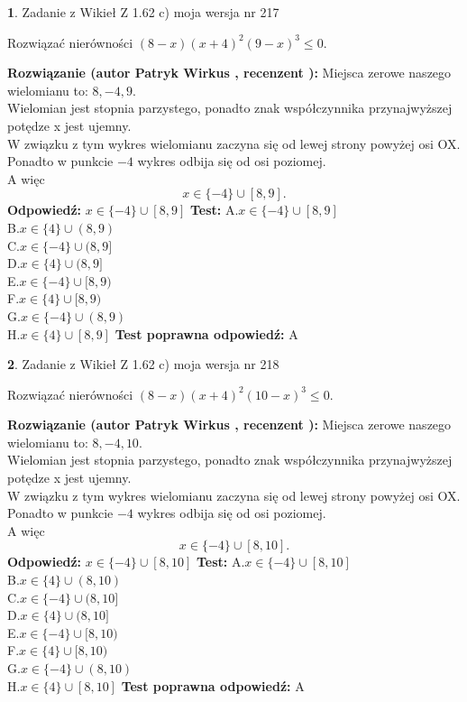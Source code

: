 \documentclass[12pt, a4paper]{article}
\theoremstyle{definition} %
\newtheorem{zad}{}
\newcommand{\zadStart}[1]{\begin{zad}#1\newline}
\newcommand{\zadStop}{\end{zad}}
\newcommand{\rozwStart}[2]{\noindent \textbf{Rozwiązanie (autor #1 , recenzent #2): }\newline}
\newcommand{\rozwStop}{\newline}
\newcommand{\odpStart}{\noindent \textbf{Odpowiedź:}\newline}
\newcommand{\odpStop}{\newline}
\newcommand{\testStart}{\noindent \textbf{Test:}\newline}
\newcommand{\testStop}{\newline}
\newcommand{\kluczStart}{\noindent \textbf{Test poprawna odpowiedź:}\newline}
\newcommand{\kluczStop}{\newline}
\begin{document}
\zadStart{Zadanie z Wikieł Z 1.62 c) moja wersja nr 217}

Rozwiązać nierówności $(8-x)(x+4)^{2}(9-x)^{3}\le0$.
\zadStop
\rozwStart{Patryk Wirkus}{}
Miejsca zerowe naszego wielomianu to: $8, -4, 9$.\\
Wielomian jest stopnia parzystego, ponadto znak współczynnika przy\linebreak najwyższej potędze x jest ujemny.\\ W związku z tym wykres wielomianu zaczyna się od lewej strony powyżej osi OX.\\
Ponadto w punkcie $-4$ wykres odbija się od osi poziomej.\\
A więc $$x \in \{-4\} \cup [8,9].$$
\rozwStop
\odpStart
$x \in \{-4\} \cup [8,9]$
\odpStop
\testStart
A.$x \in \{-4\} \cup [8,9]$\\
B.$x \in \{4\} \cup (8,9)$\\
C.$x \in \{-4\} \cup (8,9]$\\
D.$x \in \{4\} \cup (8,9]$\\
E.$x \in \{-4\} \cup [8,9)$\\
F.$x \in \{4\} \cup [8,9)$\\
G.$x \in \{-4\} \cup (8,9)$\\
H.$x \in \{4\} \cup [8,9]$
\testStop
\kluczStart
A
\kluczStop



\zadStart{Zadanie z Wikieł Z 1.62 c) moja wersja nr 218}

Rozwiązać nierówności $(8-x)(x+4)^{2}(10-x)^{3}\le0$.
\zadStop
\rozwStart{Patryk Wirkus}{}
Miejsca zerowe naszego wielomianu to: $8, -4, 10$.\\
Wielomian jest stopnia parzystego, ponadto znak współczynnika przy\linebreak najwyższej potędze x jest ujemny.\\ W związku z tym wykres wielomianu zaczyna się od lewej strony powyżej osi OX.\\
Ponadto w punkcie $-4$ wykres odbija się od osi poziomej.\\
A więc $$x \in \{-4\} \cup [8,10].$$
\rozwStop
\odpStart
$x \in \{-4\} \cup [8,10]$
\odpStop
\testStart
A.$x \in \{-4\} \cup [8,10]$\\
B.$x \in \{4\} \cup (8,10)$\\
C.$x \in \{-4\} \cup (8,10]$\\
D.$x \in \{4\} \cup (8,10]$\\
E.$x \in \{-4\} \cup [8,10)$\\
F.$x \in \{4\} \cup [8,10)$\\
G.$x \in \{-4\} \cup (8,10)$\\
H.$x \in \{4\} \cup [8,10]$
\testStop
\kluczStart
A
\kluczStop
\end{document}
